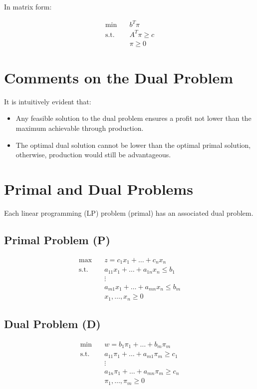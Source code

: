 \documentclass[a4paper, 11pt]{article}
\begin{document}
In matrix form:

\begin{align*}
\min & \quad b^{T} \pi \\
\text{s.t.} & \quad A^{T} \pi \geq c \\
& \quad \pi \geq 0
\end{align*}

\section{Comments on the Dual Problem}

It is intuitively evident that:

\begin{itemize}
    \item Any feasible solution to the dual problem ensures a profit not lower than the maximum achievable through production.
    \item The optimal dual solution cannot be lower than the optimal primal solution, otherwise, production would still be advantageous.
\end{itemize}

\section{Primal and Dual Problems}

Each linear programming (LP) problem (primal) has an associated dual problem.

\subsection{Primal Problem (P)}

\begin{align*}
\max & \quad z = c_{1}x_{1} + \dots + c_{n}x_{n} \\
\text{s.t.} & \quad a_{11}x_{1} + \dots + a_{1n}x_{n} \leq b_{1} \\
& \quad \vdots \\
& \quad a_{m1}x_{1} + \dots + a_{mn}x_{n} \leq b_{m} \\
& \quad x_{1}, \dots, x_{n} \geq 0
\end{align*}

\subsection{Dual Problem (D)}

\begin{align*}
\min & \quad w = b_{1} \pi_{1} + \dots + b_{m} \pi_{m} \\
\text{s.t.} & \quad a_{11} \pi_{1} + \dots + a_{m1} \pi_{m} \geq c_{1} \\
& \quad \vdots \\
& \quad a_{1n} \pi_{1} + \dots + a_{mn} \pi_{m} \geq c_{n} \\
& \quad \pi_{1}, \dots, \pi_{m} \geq 0
\end{align*}
\end{document}
